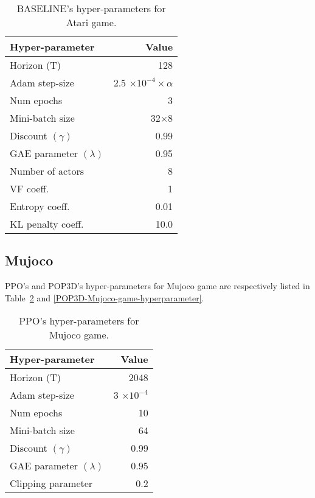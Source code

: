 \documentclass{article}
\begin{document}
\begin{table}[ht]
	\begin{center}
		\begin{tabular}{lr}
			\toprule
			Hyper-parameter & Value \\
			\midrule
			Horizon (T)    &128 \\
			Adam step-size &2.5 $\times10^{-4}\times\alpha$\\
			Num epochs    & 3 \\
			Mini-batch size    & 32$\times8$\\
			Discount $(\gamma)$     & 0.99\\
			GAE parameter $(\lambda)$      & 0.95 \\
			Number of actors      & 8\\
			VF coeff. &1 \\
			Entropy coeff. &0.01 \\
			KL penalty coeff. &10.0 \\
			\bottomrule
		\end{tabular}
	\end{center}
	\caption{BASELINE's hyper-parameters for Atari game.}
	\label{Baseline-Atari-game-hyperparameter}
\end{table}	

\subsection{Mujoco}\label{hyper-mujoco}


PPO's and  POP3D's hyper-parameters for Mujoco game are respectively listed in Table~\ref{PPO-Mujoco-game-hyperparameter} and \ref{POP3D-Mujoco-game-hyperparameter}.
\begin{table}
	\begin{center}
		\begin{tabular}{lr}
			\toprule
			Hyper-parameter & Value \\
			\midrule
			Horizon (T)    &2048 \\
			Adam step-size &3 $\times10^{-4}$\\
			Num epochs    & 10 \\
			Mini-batch size    & 64\\
			Discount $(\gamma)$     & 0.99\\
			GAE parameter $(\lambda)$      & 0.95 \\
			Clipping parameter &0.2 \\
			\bottomrule
		\end{tabular}
		\caption{PPO's hyper-parameters for Mujoco game.}
		\label{PPO-Mujoco-game-hyperparameter}
	\end{center}
\end{table}
\end{document}

